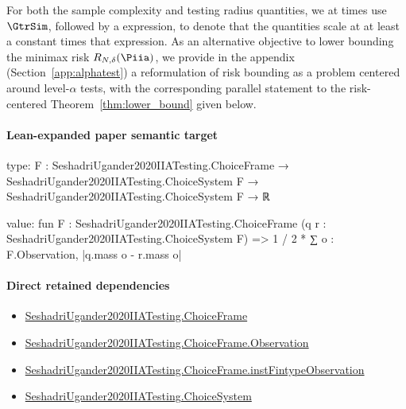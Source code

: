 \documentclass[10pt]{article}
\begin{document}
\begin{ReviewVerbatim}
	For both the sample complexity and testing radius quantities, we at times use $\GtrSim$, followed by a expression, to denote that the quantities scale at at least a constant times that expression. As an alternative objective to lower bounding the minimax risk $R_{N,\delta}(\Piia)$, we provide in the appendix (Section~\ref{app:alphatest}) a reformulation of risk bounding as a problem centered around level-$\alpha$ tests, with the corresponding parallel statement to the risk-centered Theorem~\ref{thm:lower_bound} given below.
\end{ReviewVerbatim}



\paragraph{Lean-expanded paper semantic target}
\begin{ReviewVerbatim}
type:
{F : SeshadriUgander2020IIATesting.ChoiceFrame} →
  SeshadriUgander2020IIATesting.ChoiceSystem F → SeshadriUgander2020IIATesting.ChoiceSystem F → ℝ

value:
fun {F : SeshadriUgander2020IIATesting.ChoiceFrame} (q r : SeshadriUgander2020IIATesting.ChoiceSystem F) =>
  1 / 2 * ∑ o : F.Observation, |q.mass o - r.mass o|
\end{ReviewVerbatim}

\paragraph{Direct retained dependencies}
\begin{itemize}\raggedright
\item \hyperlink{paper-prerequisite-0b24d39c6f4d1898}{Seshadri\allowbreak{}Ugander2020\allowbreak{}IIA\allowbreak{}Testing.\allowbreak{}Choice\allowbreak{}Frame}
\item \hyperlink{paper-prerequisite-d450557e9618e377}{Seshadri\allowbreak{}Ugander2020\allowbreak{}IIA\allowbreak{}Testing.\allowbreak{}Choice\allowbreak{}Frame.\allowbreak{}Observation}
\item \hyperlink{governing-declaration-a7119ec24e922f45}{Seshadri\allowbreak{}Ugander2020\allowbreak{}IIA\allowbreak{}Testing.\allowbreak{}Choice\allowbreak{}Frame.\allowbreak{}inst\allowbreak{}Fintype\allowbreak{}Observation}
\item \hyperlink{paper-prerequisite-5dca52f4dfdd597a}{Seshadri\allowbreak{}Ugander2020\allowbreak{}IIA\allowbreak{}Testing.\allowbreak{}Choice\allowbreak{}System}
\end{itemize}
\end{document}
